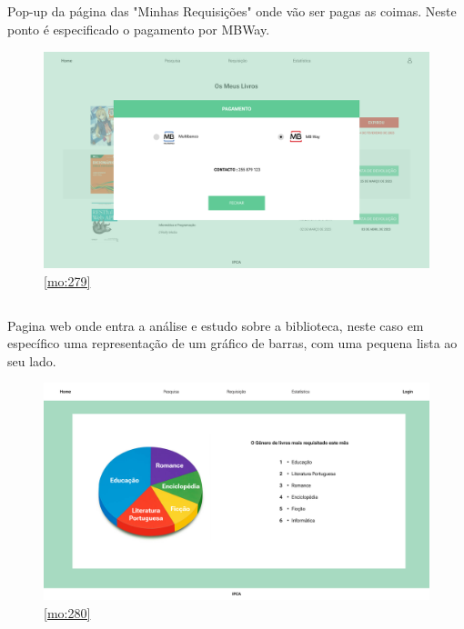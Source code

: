 \newpage

\subsection{}

Pop-up da página das "Minhas Requisições" onde vão ser pagas as coimas. Neste ponto é especificado o pagamento por MBWay.

\begin{figure}[H]
	\centering
	\includegraphics[width=1\linewidth]{../Mockups/PNGs/Pagamento de coimas MBWay.png}  %
	\caption{\ref{mo:279}}
	\label{fig:chap279}
\end{figure}


\newpage

\subsection{}

Pagina web onde entra a análise e estudo sobre a biblioteca, neste caso em específico uma representação de um gráfico de barras, com uma pequena lista ao seu lado.

\begin{figure}[H]
	\centering
	\includegraphics[width=1\linewidth]{../Mockups/PNGs/Estatistica circulo.png}  %
	\caption{\ref{mo:280}}
	\label{fig:chap280}
\end{figure}



